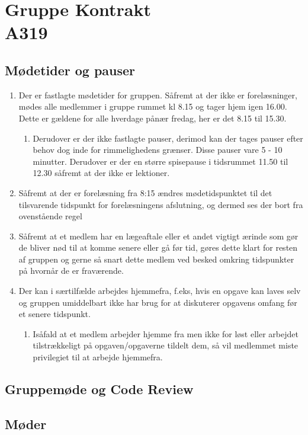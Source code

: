 \chapter{Gruppe Kontrakt\\A319}
\section{Mødetider og pauser}
\begin{enumerate}
\item Der er fastlagte mødetider for gruppen. Såfremt at der ikke er forelæsninger, mødes alle medlemmer i gruppe rummet kl 8.15 og tager hjem igen 16.00. Dette er gældene for alle hverdage pånær fredag, her er det 8.15 til 15.30.
\begin{enumerate}
\item Derudover er der ikke fastlagte pauser, derimod kan der tages pauser efter behov dog inde for rimmelighedens grænser. Disse pauser vare 5 - 10 minutter. Derudover er der en større spisepause i tidsrummet 11.50 til 12.30 såfremt at der ikke er lektioner.
\end{enumerate}
\item Såfremt at der er forelæsning fra 8:15 ændres mødetidspunktet til det tilsvarende tidspunkt for forelæsningens afslutning, og dermed ses der bort fra ovenstående regel
\item Såfremt at et medlem har en lægeaftale eller et andet vigtigt ærinde som gør de bliver nød til at komme senere eller gå før tid, gøres dette klart for resten af gruppen og gerne så snart dette medlem ved besked omkring tidspunkter på hvornår de er fraværende.
\item Der kan i særtilfælde arbejdes hjemmefra, f.eks, hvis en opgave kan laves selv og gruppen umiddelbart ikke har brug for at diskuterer opgavens omfang før et senere tidspunkt.
\begin{enumerate}
\item Isåfald at et medlem arbejder hjemme fra men ikke for løst eller arbejdet tilstrækkeligt på opgaven/opgaverne tildelt dem, så vil medlemmet miste privilegiet til at arbejde hjemmefra.
\end{enumerate}
\end{enumerate}

\section{Gruppemøde og Code Review}
\section{Møder}
